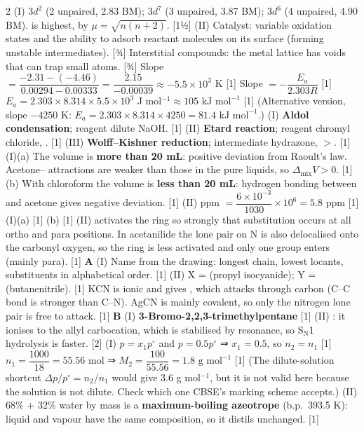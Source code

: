 \documentclass[10pt,a4paper]{extarticle}
\newcommand{\mk}[1]{{\scriptsize\color{black!55}[#1]}}
\begin{document}
\begin{multicols}{2}
\An (I)  $3d^2$ (2 unpaired, 2.83 BM);  $3d^7$ (3 unpaired, 3.87 BM);  $3d^6$ (4 unpaired, 4.90 BM). \textbf{} is highest, by $\mu=\sqrt{n(n+2)}$. \mk{1½}\nl
(II) Catalyst: variable oxidation states and the ability to adsorb reactant molecules on its surface (forming unstable intermediates). \mk{¾} Interstitial compounds: the metal lattice has voids that can trap small atoms. \mk{¾}
\An Slope $=\dfrac{-2.31-(-4.46)}{0.00294-0.00333}=\dfrac{2.15}{-0.00039}\approx-5.5\times10^{3}$ K \mk{1}\nl
Slope $=-\dfrac{E_a}{2.303R}$ \mk{1}\nl
$E_a=2.303\times8.314\times5.5\times10^{3}$ J mol$^{-1}$\nl $\approx\boxed{105\text{ kJ mol}^{-1}}$ \mk{1}\nl
(Alternative version, slope $-4250$ K: $E_a=2.303\times8.314\times4250=\boxed{81.4\text{ kJ mol}^{-1}}$.)
\An (I) \textbf{Aldol condensation}; reagent dilute NaOH. \mk{1}\nl
(II) \textbf{Etard reaction}; reagent chromyl chloride, . \mk{1}\nl
(III) \textbf{Wolff--Kishner reduction}; intermediate hydrazone, $>$. \mk{1}
\An (I)(a) The volume is \textbf{more than 20 mL}: positive deviation from Raoult's law. Acetone-- attractions are weaker than those in the pure liquids, so $\Delta_\text{mix}V>0$. \mk{1}\nl
(b) With chloroform the volume is \textbf{less than 20 mL}: hydrogen bonding between  and acetone gives negative deviation. \mk{1}\nl
(II) ppm $=\dfrac{6\times10^{-3}}{1030}\times10^{6}=\boxed{5.8\text{ ppm}}$ \mk{1}
\An (I)(a)  \mk{1}\nl
(b)  \mk{1}\nl
(II)  activates the ring so strongly that substitution occurs at all ortho and para positions. In acetanilide the lone pair on N is also delocalised onto the carbonyl oxygen, so the ring is less activated and only one group enters (mainly para). \mk{1}
\An \textbf{A} (I) \chk Name from the drawing: longest chain, lowest locants, substituents in alphabetical order. \mk{1}\nl
(II) X =  (propyl isocyanide); Y =  (butanenitrile). \mk{1} KCN is ionic and gives , which attacks through carbon (C--C bond is stronger than C--N). AgCN is mainly covalent, so only the nitrogen lone pair is free to attack. \mk{1}\nl
\textbf{B} (I) \textbf{3-Bromo-2,2,3-trimethylpentane} \mk{1}\nl
(II) : it ionises to the allyl carbocation, which is stabilised by resonance, so S$_\text{N}$1 hydrolysis is faster. \mk{2}
\An (I) $p=x_1p^\circ$ and $p=0.5p^\circ$ ⇒ $x_1=0.5$, so $n_2=n_1$ \mk{1}\nl
$n_1=\dfrac{1000}{18}=55.56$ mol ⇒ $M_2=\dfrac{100}{55.56}=\boxed{1.8\text{ g mol}^{-1}}$ \mk{1}\nl
{\scriptsize(The dilute-solution shortcut $\Delta p/p^\circ=n_2/n_1$ would give 3.6 g mol$^{-1}$, but it is not valid here because the solution is not dilute. Check which one CBSE's marking scheme accepts.)}\nl
(II) 68\%  + 32\% water by mass is a \textbf{maximum-boiling azeotrope} (b.p.\ 393.5 K): liquid and vapour have the same composition, so it distils unchanged. \mk{1}


\end{multicols}
\end{document}
